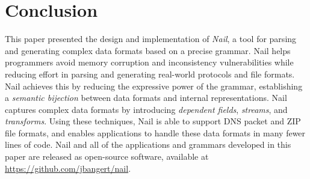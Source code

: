 \chapter{Conclusion}
\label{s:concl}

This paper presented the design and implementation of \textit{Nail},
a tool for parsing and generating complex data formats based on a
precise grammar.  Nail helps programmers avoid
memory corruption and inconsistency vulnerabilities while reducing effort
in parsing and generating real-world protocols and file formats.
Nail achieves this by reducing the expressive power of the grammar,
establishing a \emph{semantic bijection} between data formats and internal
representations.  Nail captures complex data formats by introducing
\emph{dependent fields}, \emph{streams}, and \emph{transforms}.
Using these techniques, Nail is able to support DNS packet and ZIP file
formats, and enables applications to handle these data formats in many
fewer lines of code.
Nail and all of the applications and grammars developed in this paper
are released as open-source software, available at
\url{https://github.com/jbangert/nail}.

